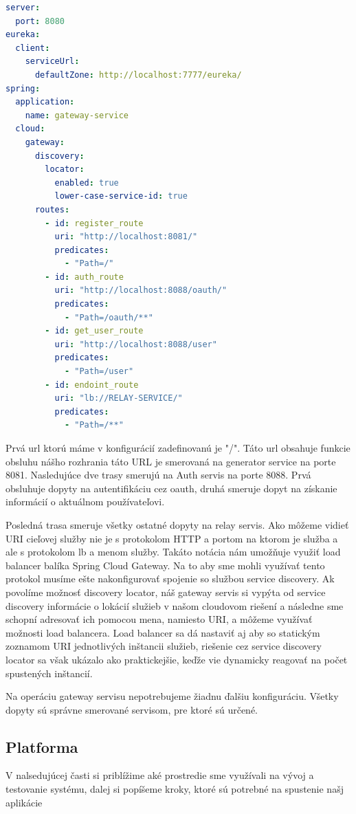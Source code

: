 \begin{lstlisting}[float, caption={Konfigurácia Gateway servisu},label={alg:gateway_config},language=yaml]
server:
  port: 8080
eureka:
  client:
    serviceUrl:
      defaultZone: http://localhost:7777/eureka/
spring:
  application:
    name: gateway-service
  cloud:
    gateway:
      discovery:
        locator:
          enabled: true
          lower-case-service-id: true
      routes:
        - id: register_route
          uri: "http://localhost:8081/"
          predicates:
            - "Path=/"
        - id: auth_route
          uri: "http://localhost:8088/oauth/"
          predicates:
            - "Path=/oauth/**"
        - id: get_user_route
          uri: "http://localhost:8088/user"
          predicates:
            - "Path=/user"
        - id: endoint_route
          uri: "lb://RELAY-SERVICE/"
          predicates:
            - "Path=/**"
\end{lstlisting} 

Prvá \acrshort{url} ktorú máme v konfigurácií zadefinovanú je "/". Táto \acrshort{url} obsahuje funkcie obsluhu nášho rozhrania táto URL je smerovaná na generator service na porte 8081. 
Nasledujúce dve trasy smerujú na Auth servis na porte 8088. Prvá obsluhuje dopyty na autentifikáciu cez \acrshort{oauth}, druhá smeruje dopyt na získanie informácií o aktuálnom používateľovi. 

Posledná trasa smeruje všetky ostatné dopyty na relay servis. Ako môžeme vidieť URI cieľovej služby nie je s protokolom HTTP a portom na ktorom je služba a ale s protokolom lb a menom služby. Takáto notácia nám umožňuje využiť load balancer balíka Spring Cloud Gateway. Na to aby sme mohli využívať tento protokol musíme ešte nakonfigurovať spojenie so službou service discovery. Ak povolíme možnosť discovery locator, náš gateway servis si vypýta od service discovery informácie o lokácií služieb v našom cloudovom riešení a následne sme schopní adresovať ich pomocou mena, namiesto URI, a môžeme využívať možnosti load balancera. Load balancer sa dá nastaviť aj aby so statickým zoznamom URI jednotlivých inštancii služieb, riešenie cez service discovery locator sa však ukázalo ako praktickejšie, keďže vie dynamicky reagovať na počet spustených inštancií.   

Na operáciu gateway servisu nepotrebujeme žiadnu ďalšiu konfiguráciu. Všetky dopyty sú správne smerované servisom, pre ktoré sú určené.


\subsection{Platforma}
V nalsedujúcej časti si priblížime aké prostredie sme využívali na vývoj a testovanie systému, dalej si popíšeme kroky, ktoré sú potrebné na spustenie našj aplikácie 

